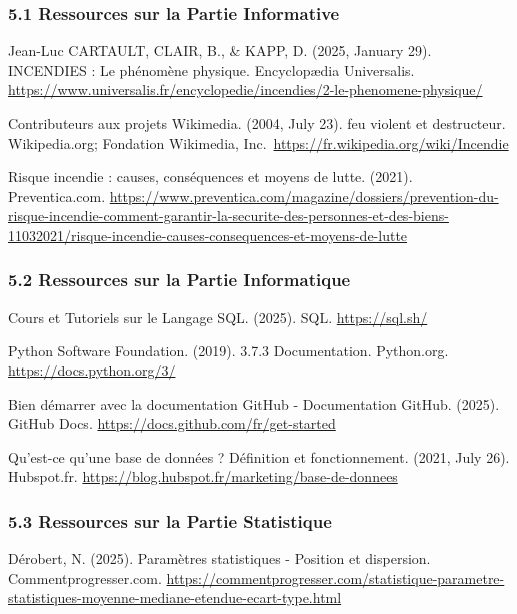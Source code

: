 \documentclass[
]{article}
\begin{document}
\subsubsection{5.1 Ressources sur la Partie
Informative}\label{ressources-sur-la-partie-informative}

Jean-Luc CARTAULT, CLAIR, B., \& KAPP, D. (2025, January 29). INCENDIES
: Le phénomène physique. Encyclopædia Universalis.
\url{https://www.universalis.fr/encyclopedie/incendies/2-le-phenomene-physique/}

Contributeurs aux projets Wikimedia. (2004, July 23). feu violent et
destructeur. Wikipedia.org; Fondation Wikimedia,
Inc.~\url{https://fr.wikipedia.org/wiki/Incendie}

Risque incendie : causes, conséquences et moyens de lutte. (2021).
Preventica.com.
\url{https://www.preventica.com/magazine/dossiers/prevention-du-risque-incendie-comment-garantir-la-securite-des-personnes-et-des-biens-11032021/risque-incendie-causes-consequences-et-moyens-de-lutte}

\subsubsection{5.2 Ressources sur la Partie
Informatique}\label{ressources-sur-la-partie-informatique}

Cours et Tutoriels sur le Langage SQL. (2025). SQL.
\url{https://sql.sh/}

Python Software Foundation. (2019). 3.7.3 Documentation. Python.org.
\url{https://docs.python.org/3/}

Bien démarrer avec la documentation GitHub - Documentation GitHub.
(2025). GitHub Docs. \url{https://docs.github.com/fr/get-started}

Qu'est-ce qu'une base de données ? Définition et fonctionnement. (2021,
July 26). Hubspot.fr.
\url{https://blog.hubspot.fr/marketing/base-de-donnees}

\subsubsection{5.3 Ressources sur la Partie
Statistique}\label{ressources-sur-la-partie-statistique}

Dérobert, N. (2025). Paramètres statistiques - Position et dispersion.
Commentprogresser.com.
\url{https://commentprogresser.com/statistique-parametre-statistiques-moyenne-mediane-etendue-ecart-type.html}
\end{document}
